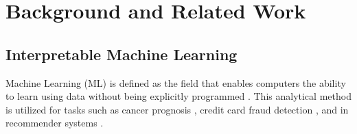 \chapter{Background and Related Work\label{chap:background}}

\section{Interpretable Machine Learning}

Machine Learning (ML) is defined as the field that enables computers the ability to learn using data
without being explicitly programmed \citep{mahesh2020machine}. This analytical 
method is utilized for tasks such as cancer prognosis \citep{kourou2015machine}, credit 
card fraud detection \citep{awoyemi2017credit}, and in recommender systems \citep{portugal2018use}.


